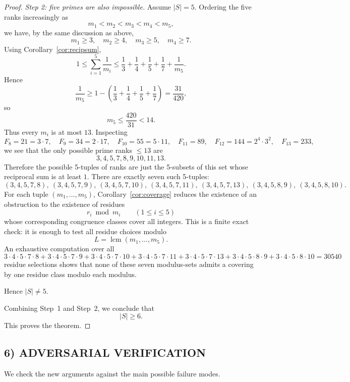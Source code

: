 \begin{proof}
\smallskip
\noindent\emph{Step 2: five primes are also impossible.}
Assume $|S|=5$. Ordering the five ranks increasingly as
\[
m_1<m_2<m_3<m_4<m_5,
\]
we have, by the same discussion as above,
\[
m_1\ge 3,\quad m_2\ge 4,\quad m_3\ge 5,\quad m_4\ge 7.
\]
Using Corollary~\ref{cor:recipsum},
\[
1\le \sum_{i=1}^5 \frac1{m_i}
\le \frac13+\frac14+\frac15+\frac17+\frac1{m_5}.
\]
Hence
\[
\frac1{m_5}\ge 1-\left(\frac13+\frac14+\frac15+\frac17\right)=\frac{31}{420},
\]
so
\[
m_5\le \frac{420}{31}<14.
\]
Thus every $m_i$ is at most $13$. Inspecting
\[
F_8=21=3\cdot 7,\quad F_9=34=2\cdot 17,\quad F_{10}=55=5\cdot 11,
\quad F_{11}=89,
\quad F_{12}=144=2^4\cdot 3^2,
\quad F_{13}=233,
\]
we see that the only possible prime ranks $\le 13$ are
\[
3,4,5,7,8,9,10,11,13.
\]
Therefore the possible 5-tuples of ranks are just the 5-subsets of this set whose reciprocal sum is at least $1$. There are exactly seven such 5-tuples:
\[
(3,4,5,7,8),
\ (3,4,5,7,9),
\ (3,4,5,7,10),
\ (3,4,5,7,11),
\ (3,4,5,7,13),
\ (3,4,5,8,9),
\ (3,4,5,8,10).
\]
For each tuple $(m_1,\dots,m_5)$, Corollary~\ref{cor:coverage} reduces the existence of an obstruction to the existence of residues
\[
r_i\bmod m_i \qquad (1\le i\le 5)
\]
whose corresponding congruence classes cover all integers. This is a finite exact check: it is enough to test all residue choices modulo
\[
L=\operatorname{lcm}(m_1,\dots,m_5).
\]
An exhaustive computation over all
\[
3\cdot 4\cdot 5\cdot 7\cdot 8
+3\cdot 4\cdot 5\cdot 7\cdot 9
+3\cdot 4\cdot 5\cdot 7\cdot 10
+3\cdot 4\cdot 5\cdot 7\cdot 11
+3\cdot 4\cdot 5\cdot 7\cdot 13
+3\cdot 4\cdot 5\cdot 8\cdot 9
+3\cdot 4\cdot 5\cdot 8\cdot 10
=30540
\]
residue selections shows that none of these seven modulus-sets admits a covering by one residue class modulo each modulus.

Hence $|S|\neq 5$.

Combining Step~1 and Step~2, we conclude that
\[
|S|\ge 6.
\]
This proves the theorem.
\end{proof}

\subsection*{6) ADVERSARIAL VERIFICATION}
We check the new arguments against the main possible failure modes.

